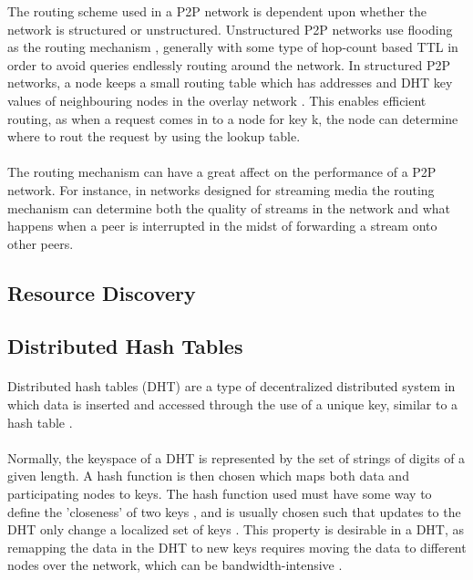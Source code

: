 \documentclass[12pt,letterpaper]{article}
\begin{document}
The routing scheme used in a P2P network is dependent upon whether the network is structured or unstructured.
Unstructured P2P networks use flooding as the routing mechanism \cite{overlay}, generally with some type of hop-count based TTL in order to avoid queries endlessly routing around the network.
In structured P2P networks, a node keeps a small routing table which has addresses and DHT key values of neighbouring nodes in the overlay network \cite{overlay}.
This enables efficient routing, as when a request comes in to a node for key k, the node can determine where to rout the request by using the lookup table.

\paragraph{}

The routing mechanism can have a great affect on the performance of a P2P network.
For instance, in networks designed for streaming media \cite{streaming} the routing mechanism can determine both the quality of streams in the network and what happens when a peer is interrupted in the midst of forwarding a stream onto other peers.

\subsection{Resource Discovery}

\subsection{Distributed Hash Tables}

\paragraph{}

Distributed hash tables (DHT) are a type of decentralized distributed system in which data is inserted and accessed through the use of a unique key, similar to a hash table \cite{dht}\cite{wiki-dht}.

\paragraph{}

Normally, the keyspace of a DHT is represented by the set of strings of digits of a given length.
A hash function is then chosen which maps both data and participating nodes to keys.
The hash function used must have some way to define the 'closeness' of two keys \cite{dht}, and is usually chosen such that updates to the DHT only change a localized set of keys \cite{wiki-dht}.
This property is desirable in a DHT, as remapping the data in the DHT to new keys requires moving the data to different nodes over the network, which can be bandwidth-intensive \cite{wiki-dht}.
\end{document}
